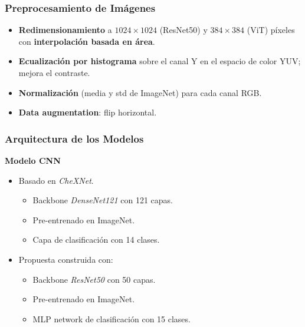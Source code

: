 \begin{frame}
\frametitle{Preprocesamiento de Imágenes}
\begin{itemize}
    \item \textbf{Redimensionamiento} a $1024 \times 1024$ (ResNet50) y $384 \times 384$ (ViT) píxeles con \textbf{interpolación basada en área}.
    \item \textbf{Ecualización por histograma} sobre el canal Y en el espacio de color YUV; mejora el contraste.
    \item \textbf{Normalización} (media y std de ImageNet) para cada canal RGB.
    \item \textbf{Data augmentation}: flip horizontal.
\end{itemize}
\end{frame}

\begin{frame}
\frametitle{Arquitectura de los Modelos}
    \textbf{Modelo CNN}
    \begin{itemize}
        \item Basado en \textit{CheXNet}.
        \begin{itemize}
            \item Backbone \textit{DenseNet121} con 121 capas.
            \item Pre-entrenado en ImageNet.
            \item Capa de clasificación con 14 clases.
        \end{itemize}
        \item Propuesta construida con:
        \begin{itemize}
            \item Backbone \textit{ResNet50} con 50 capas.
            \item Pre-entrenado en ImageNet.
            \item MLP network de clasificación con 15 clases.
        \end{itemize}
    \end{itemize}
\end{frame}

